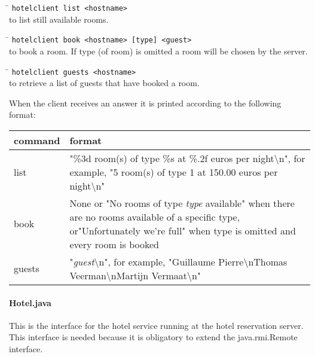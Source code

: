\documentclass[a4paper,10pt]{article}
\begin{document}
\begin{tabbing}
\hspace{20pt}\=\kill
 \> \texttt{hotelclient list <hostname>} \\
 \> to list still available rooms.
\end{tabbing}

\begin{tabbing}
\hspace{20pt}\=\kill
 \> \texttt{hotelclient book <hostname> [type] <guest>} \\
 \> to book a room. If type (of room) is omitted a room will be chosen by the server.
\end{tabbing}

\begin{tabbing}
\hspace{20pt}\=\kill
 \> \texttt{hotelclient guests <hostname>} \\
 \> to retrieve a list of guests that have booked a room.
\end{tabbing}

When the client receives an answer it is printed according to the following format:

\begin{center}
\begin{tabular}{ l | p{9.3cm} }
\textbf{command} & \textbf{format}\\ \hline
list & "\%3d room(s) of type \%s at \%.2f euros per night\textbackslash n", for example, "5 room(s) of type 1 at 150.00 euros per night\textbackslash n"\\ \hline
book & None or "No rooms of type \emph{type} available" when there are no rooms available of a specific type, or"Unfortunately we're full" when type is omitted and every room is booked \\ \hline
guests & "\emph{guest}\textbackslash n", for example, "Guillaume Pierre\textbackslash nThomas Veerman\textbackslash nMartijn Vermaat\textbackslash n" \\
\end{tabular}
\end{center}

\paragraph{Hotel.java}
This is the interface for the hotel service running at the hotel reservation server. This interface is needed because it is obligatory to extend the java.rmi.Remote interface.
 
\end{document}
